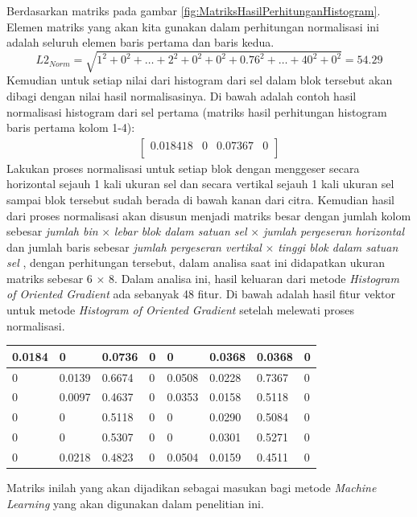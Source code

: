 \begin{enumerate}
\begin{table}[H]
\end{table}
Berdasarkan matriks pada gambar \ref{fig:MatriksHasilPerhitunganHistogram}. Elemen matriks yang akan kita gunakan dalam perhitungan normalisasi ini adalah seluruh elemen baris pertama dan baris kedua.
\begin{equation*}
L2_{Norm} = \sqrt{1^2 + 0^2 + \ldots + 2^2 + 0^2 + 0^2 + 0.76^2 + \ldots + 40^2 + 0^2} = 54.29
\end{equation*}
Kemudian untuk setiap nilai dari histogram dari sel dalam blok tersebut akan dibagi dengan nilai hasil normalisasinya. Di bawah adalah contoh hasil normalisasi histogram dari sel pertama (matriks hasil perhitungan histogram baris pertama kolom 1-4):
\begin{gather*}
\begin{bmatrix}
0.018418 & 0 & 0.07367 & 0 \\
\end{bmatrix}
\end{gather*}
Lakukan proses normalisasi untuk setiap blok dengan menggeser secara horizontal sejauh 1 kali ukuran sel dan secara vertikal sejauh 1 kali ukuran sel sampai blok tersebut sudah berada di bawah kanan dari citra. Kemudian hasil dari proses normalisasi akan disusun menjadi matriks besar dengan jumlah kolom sebesar  \textit{jumlah bin} $\times$ \textit{lebar blok dalam satuan sel} $\times$ \textit{jumlah pergeseran horizontal} dan jumlah baris sebesar \textit{jumlah pergeseran vertikal} $\times$ \textit{tinggi blok dalam satuan sel} , dengan perhitungan tersebut, dalam analisa saat ini didapatkan ukuran matriks sebesar 6 $\times$ 8. Dalam analisa ini, hasil keluaran dari metode \textit{Histogram of Oriented Gradient} ada sebanyak 48 fitur. Di bawah adalah hasil fitur vektor untuk metode \textit{Histogram of Oriented Gradient} setelah melewati proses normalisasi.
\begin{table}[H]
	\centering
	\begin{small}
		\begin{tabular}{|p{1cm}|p{1cm}|p{1cm}|p{1cm}|p{1cm}|p{1cm}|p{1cm}|p{1cm}|}
			\hline
			0.0184 & 0 & 0.0736 & 0 & 0 & 0.0368 & 0.0368 & 0\\
			\hline
			0 & 0.0139 & 0.6674 & 0 & 0.0508 & 0.0228 & 0.7367 & 0\\
			\hline
			0 & 0.0097 & 0.4637 & 0 & 0.0353 & 0.0158 & 0.5118 & 0\\
			\hline
			0 & 0 & 0.5118 & 0 & 0 & 0.0290 & 0.5084 & 0 \\
			\hline
			0 & 0 & 0.5307 & 0 & 0 & 0.0301 & 0.5271 & 0 \\
			\hline
			0 & 0.0218 & 0.4823 & 0 & 0.0504 & 0.0159 & 0.4511 & 0 \\
			\hline
		\end{tabular}
	\end{small}
	\label{fig:MatriksHasilNormalisasi}
\end{table}
Matriks inilah yang akan dijadikan sebagai masukan bagi metode \textit{Machine Learning} yang akan digunakan dalam penelitian ini.
\end{enumerate}
